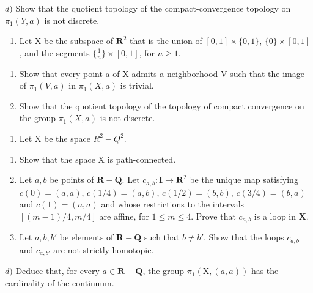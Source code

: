 \(d)\) Show that the quotient topology of the compact-convergence topology on \(\pi_1(Y,a)\) is not discrete.

\begin{enumerate}
\def\labelenumi{\arabic{enumi})}
\setcounter{enumi}{4}
\tightlist
\item
  Let X be the subspace of \(\mathbf{R}^2\) that is the union of \([0,1] \times \{0,1\}\), \(\{0\} \times [0,1]\), and the segments \(\{\frac{1}{n}\} \times [0,1]\), for \(n \geqslant 1\).
\end{enumerate}

\begin{enumerate}
\def\labelenumi{\alph{enumi})}
\item
  Show that every point a of X admits a neighborhood V such that the image of \(\pi_{1}(V,a)\) in \(\pi_{1}(X,a)\) is trivial.
\item
  Show that the quotient topology of the topology of compact convergence on the group \(\pi_{1}(X,a)\) is not discrete.
\end{enumerate}

\begin{enumerate}
\def\labelenumi{\arabic{enumi})}
\setcounter{enumi}{5}
\tightlist
\item
  Let X be the space \(R^{2}-Q^{2}\).
\end{enumerate}

\begin{enumerate}
\def\labelenumi{\alph{enumi})}
\item
  Show that the space X is path-connected.
\item
  Let \(a, b\) be points of \(\mathbf{R} - \mathbf{Q}\). Let \(c_{a,b}: \mathbf{I} \to \mathbf{R}^2\) be the unique map satisfying \(c(0) = (a, a)\), \(c(1/4) = (a, b)\), \(c(1/2) = (b, b)\), \(c(3/4) = (b, a)\) and \(c(1) = (a, a)\) and whose restrictions to the intervals \([(m-1)/4, m/4]\) are affine, for \(1 \leqslant m \leqslant 4\). Prove that \(c_{a,b}\) is a loop in \(\mathbf{X}\).
\item
  Let \(a, b, b'\) be elements of \(\mathbf{R} - \mathbf{Q}\) such that \(b \neq b'\). Show that the loops \(c_{a,b}\) and \(c_{a,b'}\) are not strictly homotopic.
\end{enumerate}

\(d)\) Deduce that, for every \(a \in \mathbf{R} - \mathbf{Q}\), the group \(\pi_1(\mathrm{X}, (a, a))\) has the cardinality of the continuum.
